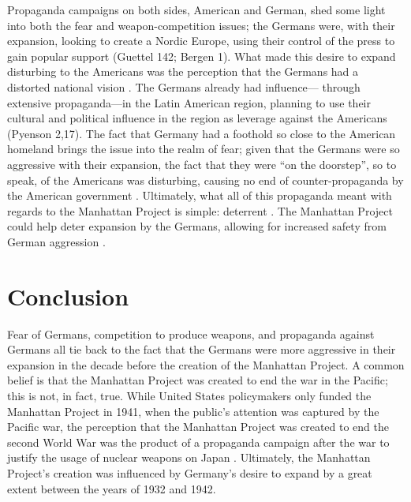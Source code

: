 \documentclass[a4paper,12pt]{article}
\begin{document}
        Propaganda campaigns on both sides, American and German, shed some light into both the fear
        and weapon-competition issues; the Germans were, with their expansion, looking to create a
        Nordic Europe, using their control of the press to gain popular support (Guettel 142; Bergen
        1). What made this desire to expand disturbing to the Americans was the perception that the
        Germans had a distorted national vision \cite[37]{kallisa}. The Germans already had influence---
        through extensive propaganda---in the Latin American region, planning to use their cultural
        and political influence in the region as leverage against the Americans (Pyenson 2,17). The
        fact that Germany had a foothold so close to the American homeland brings the issue into the
        realm of fear; given that the Germans were so aggressive with their expansion, the fact that
        they were ``on the doorstep'', so to speak, of the Americans was disturbing, causing no end
        of counter-propaganda by the American government \cite[2]{lauriec}. Ultimately, what all of this
        propaganda meant with regards to the Manhattan Project is simple: deterrent \cite[140]{grovesl}.
        The Manhattan Project could help deter expansion by the Germans, allowing for increased
        safety from German aggression \cite[140]{grovesl}.


    \section{Conclusion}

        Fear of Germans, competition to produce weapons, and propaganda against Germans all tie back
        to the fact that the Germans were more aggressive in their expansion in the decade before
        the creation of the Manhattan Project. A common belief is that the Manhattan Project was
        created to end the war in the Pacific; this is not, in fact, true. While United States
        policymakers only funded the Manhattan Project in 1941, when the public's attention was
        captured by the Pacific war, the perception that the Manhattan Project was created to end
        the second World War was the product of a propaganda campaign after the war to justify the
        usage of nuclear weapons on Japan \cite[12]{norrism}. Ultimately, the Manhattan Project's creation
        was influenced by Germany's desire to expand by a great extent between the years of 1932 and
        1942.


    \printbibliography
\end{document}
